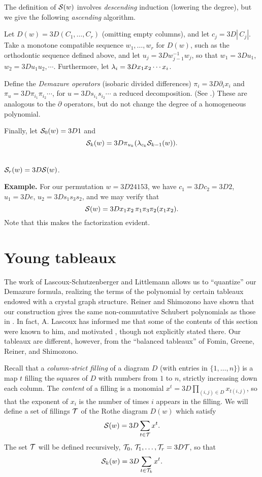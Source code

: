 The definition of ${\cal S}(w)$ involves {\em descending} induction
(lowering the degree), but we give the following
{\em ascending} algorithm.

Let $D(w) =3D (C_1, \ldots, C_r)$ (omitting empty columns),
and let $c_j =3D |\, C_j|$.
Take a monotone compatible sequence $w_1, \ldots, w_r$ for $D(w)$,
such as the orthodontic sequence defined above, and
let $u_j =3D w_{j-1}^{-1} w_j$, so that
$w_1 =3D u_1$,\, $w_2 =3D u_1 u_2, \cdots$.
Furthermore, let $\lambda_i =3D x_1 x_2 \cdots x_i$.

Define the {\em Demazure operators} (isobaric divided differences)
$ \pi_i =3D \partial_i x_i$ and $\pi_u =3D \pi_{i_1} \pi_{i_2} \cdots$,
for $u =3D s_{i_1} s_{i_2} \cdots$ a reduced decomposition.
(See \cite{Dem}.)
These are analogous to the $\partial$ operators, but
do not change the degree of a homogeneous polynomial.

Finally, let ${\cal S}_0(w) =3D 1$
and
$$
{\cal S}_k(w) =3D \pi_{u_k}(\lambda_{c_k} {\cal S}_{k-1}(w)).
$$

\begin{thm} \mbox{} \\
\mbox{} \hfill ${\cal S}_r(w) =3D {\cal S}(w)$.\hfill \mbox{}
\end{thm}
{\bf Example.}
For our permutation $w =3D 24153$,
we have $c_1 =3D c_2 =3D 2$, $u_1 =3D e$, $u_2 =3D s_1 s_3 s_2$,
and we may verify that
$$
{\cal S}(w) =3D x_1 x_2 \, \pi_1 \pi_3 \pi_2(x_1 x_2) .
$$
Note that this makes the factorization evident.

\section{Young tableaux}

The work of
Lascoux-Schutzenberger \cite{LS3} and Littlemann
\cite{Lit} allows us to ``quantize'' our Demazure
formula, realizing the terms of the polynomial by
certain tableaux endowed with a crystal graph
structure.   Reiner and Shimozono have shown that our construction
gives the same
non-commutative Schubert polynomials as those in
\cite{LS2}.  In fact, A. Lascoux has informed me that
some of the contents of this section were known to him, and motivated
\cite{LS2}, though not explicitly stated there.
Our tableaux are different, however, from the
``balanced tableaux'' of Fomin, Greene, Reiner,
and Shimozono.

Recall that a {\em column-strict filling} of a diagram $D$
(with entries in $\{1,\ldots, n\}$) is
a map $t$ filling the squares of $D$ with numbers from
$1$ to $n$,
strictly increasing down each column.
The {\em content} of a filling is a monomial
$x^t =3D \prod_{(i,j) \in D} x_{t(i,j)}$, so that the
exponent of $x_i$ is the number of times $i$ appears in the
filling.
We will define a set of fillings
${\cal T}$ of the Rothe diagram $D(w)$ which satisfy
$$
{\cal S}(w) =3D \sum_{t \in {\cal T}} x^t.
$$
The set ${\cal T}$ will be defined recursively,
${\cal T}_0,\,  {\cal T}_1, \ldots, {\cal T}_r =3D {\cal T}$,
so that
$$
{\cal S}_k(w) =3D \sum_{t \in {\cal T}_k} x^t.
$$

